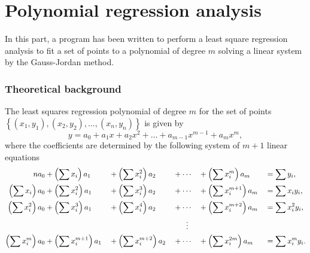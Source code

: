 \graphicspath{{./figures/}}

\part{Polynomial regression analysis}
In this part, a program has been written to perform a least square regression
analysis to fit a set of points to a polynomial of degree $m$ solving a 
linear system by the Gauss-Jordan method.

\section{Theoretical background}\label{theoretical_background}

The least squares regression polynomial of degree $m$ for the set of points
$\left\{ \left( x_1,y_1 \right), \left( x_2,y_2 \right), \ldots, \left( x_n,y_n \right) \right\}$ 
is given by 
\begin{equation}\label{eq:original_polynomial}
    y = a_0 + a_1 x + a_2 x^2 + \ldots + a_{m - 1} x^{m - 1} + a_m x^m,
\end{equation}
where the coefficients are determined by the following system of $m + 1$ linear
equations 
\begin{alignat}{5}
    n a_0                          &+ \left( \sum x_i  \right) a_1       &&+ \left( \sum x_i^2  \right) a_2       &&+ \cdots &&+ \left( \sum x_i^m  \right) a_m     &&= \sum y_i       ,\\
    \left( \sum x_i  \right) a_0   &+ \left( \sum x_i^{2}  \right) a_1   &&+ \left( \sum x_i^3  \right) a_2       &&+ \cdots &&+ \left( \sum x_i^{m+1}  \right) a_m &&= \sum x_i y_i   ,\\
    \left( \sum x_i^2  \right) a_0 &+ \left( \sum x_i^{3}  \right) a_1   &&+ \left( \sum x_i^4  \right) a_2       &&+ \cdots &&+ \left( \sum x_i^{m+2}  \right) a_m &&= \sum x_i^2 y_i ,\\
    \notag
                                   & && && \hspace{0.6cm} \vdots && && \\
    \left( \sum x_i^m  \right) a_0 &+ \left( \sum x_i^{m+1}  \right) a_1 &&+ \left( \sum x_i^{m + 2}  \right) a_2 &&+ \cdots &&+ \left( \sum x_i^{2m}  \right) a_m  &&= \sum x_i^m y_i.
\end{alignat}

